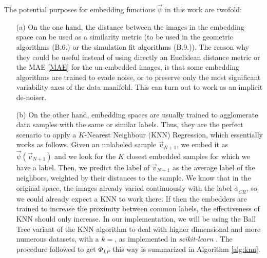 \documentclass[11pt, a4paper, twoside]{article} %
\begin{document}
The potential purposes for embedding functions $\vec{\psi}$ in this work are twofold:
\begin{itemize}
\item[(a)] On the one hand, the distance between the images in the embedding space can be used as a similarity metric (to be used in the geometric algorithms (B.6.) or the simulation fit algorithms (B.9.)). The reason why they could be useful instead of using directly an Euclidean distance metric or the MAE \eqref{MAE} for the un-embedded images, is that some embedding algorithms are trained to evade noise, or to preserve only the most significant variability axes of the data manifold. This can turn out to work as an implicit de-noiser.

\item[(b)] On the other hand, embedding spaces are usually trained to agglomerate data samples with the same or similar labels. Thus, they are the perfect scenario to apply a $K$-Nearest Neighbour (KNN) Regression, which essentially works as follows. Given an unlabeled sample $\vec{v}_{N+1}$, we embed it as $\vec{\psi}(\vec{v}_{N+1})$ and we look for the $K$ closest embedded samples for which we have a label. Then, we predict the label of $\vec{v}_{N+1}$ as the average label of the neighbors, weighted by their distances to the sample. We know that in the original space, the images already varied continuously with the label $\phi_{CR}$, so we could already expect a KNN to work there. If then the embedders are trained to increase the proximity between common labels, the effectiveness of KNN should only increase. In our implementation, we will be using the Ball Tree \cite{balltree} variant of the KNN algorithm to deal with higher dimensional and more numerous datasets, with a $k=$, as implemented in {\em scikit-learn} \cite{sklearn}. The procedure followed to get $\Phi_{LP}$ this way is summarized in Algorithm \ref{alg:knn}.
\end{itemize}

 
\end{document}
